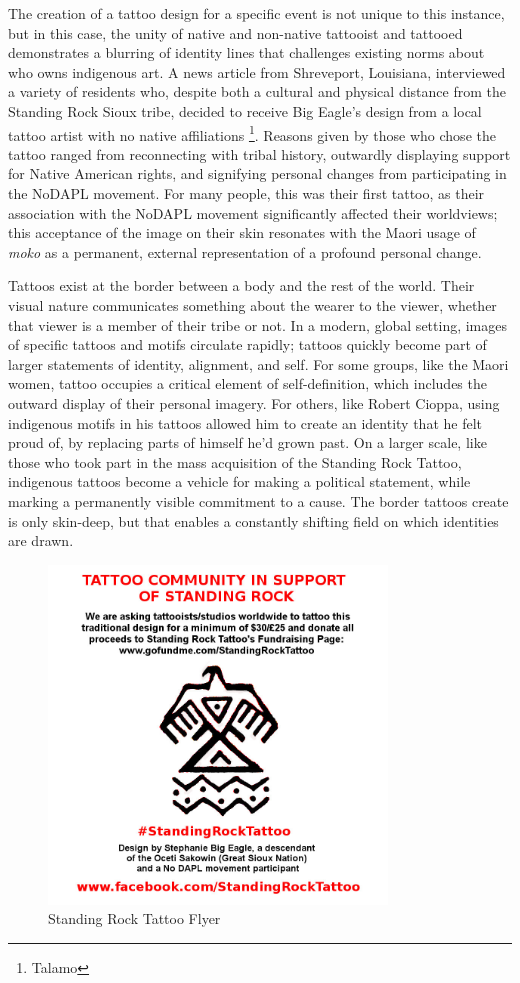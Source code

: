The creation of a tattoo design for a specific event is not unique to this
instance, but in this case, the unity of native and non-native tattooist and
tattooed demonstrates a blurring of identity lines that challenges existing
norms about who owns indigenous art. A news article from Shreveport,
Louisiana, interviewed a variety of residents who, despite both a cultural
and physical distance from the Standing Rock Sioux tribe, decided to receive Big
Eagle's design from a local tattoo artist with no native affiliations
\footnote{Talamo}. Reasons given by those who chose the tattoo ranged from
reconnecting with tribal history, outwardly displaying support for Native
American rights, and signifying personal changes from participating in the
NoDAPL movement. For many people, this was their first tattoo, as their
association with the NoDAPL movement significantly affected their worldviews; this acceptance
of the image on their skin resonates with the Maori usage of \textit{moko} as a
permanent, external representation of a profound personal change.

Tattoos exist at the border between a body and the rest of the world. Their
visual nature communicates something about the wearer to the viewer, whether
that viewer is a member of their tribe or not. In a modern, global setting,
images of specific tattoos and motifs circulate rapidly; tattoos quickly become
part of larger statements of identity, alignment, and self. For some groups,
like the Maori women, tattoo occupies a critical element of self-definition,
which includes the outward display of their personal imagery. For others, like
Robert Cioppa, using indigenous motifs in his tattoos allowed him to create an
identity that he felt proud of, by replacing parts of himself he'd grown past.
On a larger scale, like those who took part in the mass acquisition of the
Standing Rock Tattoo, indigenous tattoos
become a vehicle for making a political statement, while marking a permanently
visible commitment to a cause. The border tattoos create is only skin-deep, but
that enables a constantly shifting field on which identities are drawn.

\begin{figure}[ht!]
  \centering
  \includegraphics[width=90mm]{standingrock.jpg}
  \caption{Standing Rock Tattoo Flyer\label{overflow}}
\end{figure}

